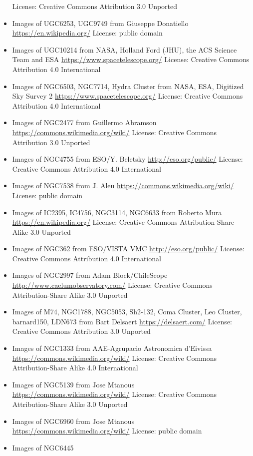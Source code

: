 \begin{itemize}
	 License: Creative Commons Attribution 3.0 Unported
\item Images of UGC6253, UGC9749
	 from Giuseppe Donatiello
	 \url{https://en.wikipedia.org/}
	 License: public domain
\item Images of UGC10214
	 from NASA, Holland Ford (JHU), the ACS Science Team and ESA
	 \url{https://www.spacetelescope.org/}
	 License: Creative Commons Attribution 4.0 International
\item Images of NGC6503, NGC7714, Hydra Cluster
	 from NASA, ESA, Digitized Sky Survey 2
	 \url{https://www.spacetelescope.org/}
	 License: Creative Commons Attribution 4.0 International
\item Images of NGC2477
	 from Guillermo Abramson
	 \url{https://commons.wikimedia.org/wiki/}
	 License: Creative Commons Attribution 3.0 Unported
\item Images of NGC4755
	 from ESO/Y. Beletsky
	 \url{http://eso.org/public/}
	 License: Creative Commons Attribution 4.0 International 
\item Images of NGC7538
	 from J. Aleu
	 \url{https://commons.wikimedia.org/wiki/}
	 License: public domain
\item Images of IC2395, IC4756, NGC3114, NGC6633
	 from Roberto Mura
	 \url{https://en.wikipedia.org/}
	 License: Creative Commons Attribution-Share Alike 3.0 Unported
\item Images of NGC362
	 from ESO/VISTA VMC
	 \url{http://eso.org/public/}
	 License: Creative Commons Attribution 4.0 International 
\item Images of NGC2997
	 from Adam Block/ChileScope
	 \url{http://www.caelumobservatory.com/}
	 License: Creative Commons Attribution-Share Alike 3.0 Unported
\item Images of M74, NGC1788, NGC5053, Sh2-132, Coma Cluster, Leo Cluster, barnard150, LDN673
	 from Bart Delsaert
	 \url{https://delsaert.com/}
	 License: Creative Commons Attribution 3.0 Unported
\item Images of NGC1333
	 from AAE-Agrupacio Astronomica d'Eivissa
	 \url{https://commons.wikimedia.org/wiki/}
	 License: Creative Commons Attribution-Share Alike 4.0 International
\item Images of NGC5139
	 from Jose Mtanous
	 \url{https://commons.wikimedia.org/wiki/}
	 License: Creative Commons Attribution-Share Alike 3.0 Unported
\item Images of NGC6960
	 from Jose Mtanous
	 \url{https://commons.wikimedia.org/wiki/}
	 License: public domain
\item Images of NGC6445

\end{itemize}
